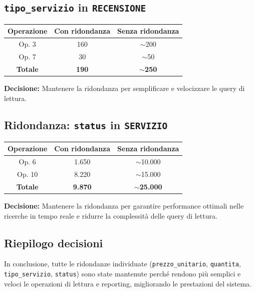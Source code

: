 \documentclass[a4paper,12pt]{report}
\begin{document}
\subsection{\texttt{tipo\_servizio} in \texttt{RECENSIONE}}
\begin{table}[H]
	\centering
	\begin{tabular}{|c|c|c|}
		\hline
		\textbf{Operazione} & \textbf{Con ridondanza} & \textbf{Senza ridondanza} \\
		\hline
		Op. 3               & 160                     & $\sim$200                 \\
		\hline
		Op. 7               & 30                      & $\sim$50                  \\
		\hline
		\textbf{Totale}     & \textbf{190}            & $\sim$\textbf{250}        \\
		\hline
	\end{tabular}
\end{table}

\textbf{Decisione:} Mantenere la ridondanza per semplificare e velocizzare le query di lettura.

\subsection{Ridondanza: \texttt{status} in \texttt{SERVIZIO}}
\begin{table}[H]
	\centering
	\begin{tabular}{|c|c|c|}
		\hline
		\textbf{Operazione} & \textbf{Con ridondanza} & \textbf{Senza ridondanza} \\
		\hline
		Op. 6               & 1.650                   & $\sim$10.000              \\
		\hline
		Op. 10              & 8.220                   & $\sim$15.000              \\
		\hline
		\textbf{Totale}     & \textbf{9.870}          & $\sim$\textbf{25.000}     \\
		\hline
	\end{tabular}
\end{table}

\textbf{Decisione:} Mantenere la ridondanza per garantire performance ottimali nelle ricerche in tempo reale e ridurre la complessità delle query di lettura.

\subsection{Riepilogo decisioni}
In conclusione, tutte le ridondanze individuate (\texttt{prezzo\_unitario}, \texttt{quantita}, \newline \texttt{tipo\_servizio}, \texttt{status}) sono state
mantenute perché rendono più semplici e veloci le operazioni di lettura e reporting, migliorando le prestazioni del sistema.
\end{document}

